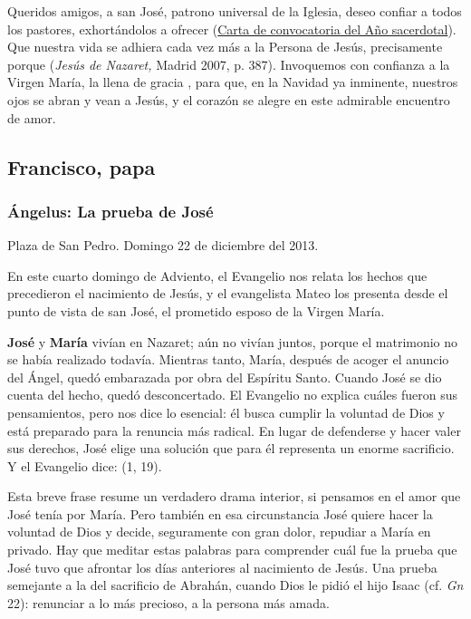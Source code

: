 Queridos amigos, a san José, patrono universal de la Iglesia, deseo confiar a todos los pastores, exhortándolos a ofrecer  (\href{https://www.deiverbum.org/content/benedict-xvi/es/letters/2009/documents/hf_ben-xvi_let_20090616_anno-sacerdotale.html}{Carta de convocatoria del Año sacerdotal}). Que nuestra vida se adhiera cada vez más a la Persona de Jesús, precisamente porque  (\emph{Jesús de Nazaret,} Madrid 2007, p. 387). Invoquemos con confianza a la Virgen María, la llena de gracia , para que, en la Navidad ya inminente, nuestros ojos se abran y vean a Jesús, y el corazón se alegre en este admirable encuentro de amor.

\subsection{Francisco, papa}

\subsubsection{Ángelus: La prueba de José}

Plaza de San Pedro. Domingo 22 de diciembre del 2013.

En este cuarto domingo de Adviento, el Evangelio nos relata los hechos que precedieron el nacimiento de Jesús, y el evangelista Mateo los presenta desde el punto de vista de san José, el prometido esposo de la Virgen María.

\textbf{José} y \textbf{María} vivían en Nazaret; aún no vivían juntos, porque el matrimonio no se había realizado todavía. Mientras tanto, María, después de acoger el anuncio del Ángel, quedó embarazada por obra del Espíritu Santo. Cuando José se dio cuenta del hecho, quedó desconcertado. El Evangelio no explica cuáles fueron sus pensamientos, pero nos dice lo esencial: él busca cumplir la voluntad de Dios y está preparado para la renuncia más radical. En lugar de defenderse y hacer valer sus derechos, José elige una solución que para él representa un enorme sacrificio. Y el Evangelio dice:  (1, 19).

Esta breve frase resume un verdadero drama interior, si pensamos en el amor que José tenía por María. Pero también en esa circunstancia José quiere hacer la voluntad de Dios y decide, seguramente con gran dolor, repudiar a María en privado. Hay que meditar estas palabras para comprender cuál fue la prueba que José tuvo que afrontar los días anteriores al nacimiento de Jesús. Una prueba semejante a la del sacrificio de Abrahán, cuando Dios le pidió el hijo Isaac (cf. \emph{Gn} 22): renunciar a lo más precioso, a la persona más amada.

